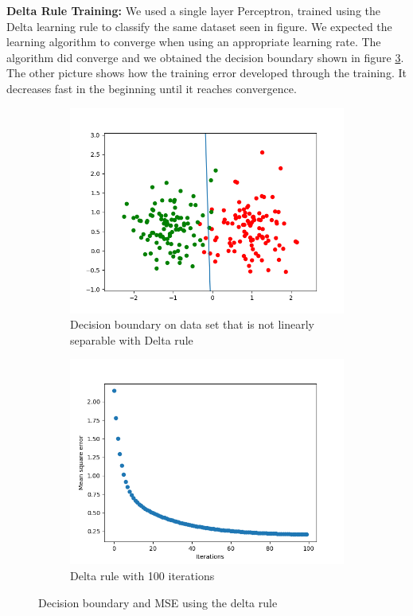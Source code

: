 \documentclass[a4paper]{article}
\begin{document}
\textbf{Delta Rule Training: }We used a single layer Perceptron, trained using the Delta learning rule to classify the same dataset seen in figure. We expected the learning algorithm to converge when using an appropriate learning rate. The algorithm did converge and we obtained the decision boundary shown in figure \ref{fig:6}. The other picture shows how the training error developed through the training. It decreases fast in the beginning until it reaches convergence. 
\begin{figure}[htb]
    \centering
    \begin{subfigure}{0.4\textwidth}
        \includegraphics[width=\textwidth]{Labs/Lab 1/Lab 1a/Results/decicion-boundary-not-separable.png}
        \caption{Decision boundary on data set that is not linearly separable with Delta rule}
        \label{fig:Decision-boundary-not-linearly-separable}
    \end{subfigure}
    \hfill
    \begin{subfigure}{0.4\textwidth}
        \includegraphics[width=\textwidth]{Labs/Lab 1/Lab 1a/Results/error-convergance.png}
        \caption{Delta rule with 100 iterations}
        \label{fig:Error-convergance}
    \end{subfigure}
    \caption{Decision boundary and MSE using the delta rule}
    \label{fig:6}
\end{figure}
\end{document}
